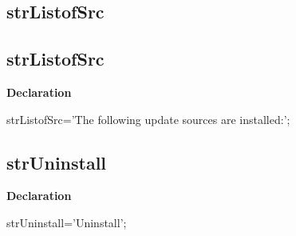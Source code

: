 \documentclass{report}
\newif\ifpdf
\begin{document}
\subsection*{\large{\textbf{strListofSrc}}\normalsize\hspace{1ex}\hrulefill}
\else
\subsection*{strListofSrc}
\fi
\label{trstrings-strListofSrc}
\begin{list}{}{
\setlength{\itemindent}{0cm}
\setlength{\listparindent}{0cm}
\setlength{\leftmargin}{\evensidemargin}
\addtolength{\leftmargin}{\tmplength}
\settowidth{\labelsep}{X}
\addtolength{\leftmargin}{\labelsep}
\setlength{\labelwidth}{\tmplength}
}
\item[\textbf{Declaration}\hfill]
\ifpdf
\begin{flushleft}
\fi
\begin{ttfamily}
strListofSrc='The following update sources are installed:';\end{ttfamily}

\ifpdf
\end{flushleft}
\fi

\end{list}
\ifpdf
\subsection*{\large{\textbf{strUninstall}}\normalsize\hspace{1ex}\hrulefill}
\else
\subsection*{strUninstall}
\fi
\label{trstrings-strUninstall}
\begin{list}{}{
\setlength{\itemindent}{0cm}
\setlength{\listparindent}{0cm}
\setlength{\leftmargin}{\evensidemargin}
\addtolength{\leftmargin}{\tmplength}
\settowidth{\labelsep}{X}
\addtolength{\leftmargin}{\labelsep}
\setlength{\labelwidth}{\tmplength}
}
\item[\textbf{Declaration}\hfill]
\ifpdf
\begin{flushleft}
\fi
\begin{ttfamily}
strUninstall='Uninstall';\end{ttfamily}

\ifpdf
\end{flushleft}
\fi

\end{list}
\ifpdf
\end{document}
